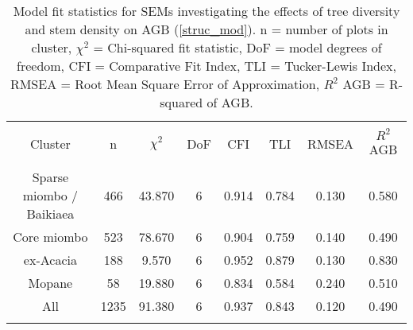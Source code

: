 
\begin{table}[!htbp] \centering 
  \caption{Model fit statistics for SEMs investigating the effects of tree diversity and stem density on AGB (\autoref{struc_mod}). n = number of plots in cluster, $\chi^{2}$ = Chi-squared fit statistic, DoF = model degrees of freedom, CFI = Comparative Fit Index, TLI = Tucker-Lewis Index, RMSEA = Root Mean Square Error of Approximation, $R^{2}$ AGB = R-squared of AGB.} 
  \label{struc_model_fit_clust_stats} 
\begin{tabular}{@{\extracolsep{0pt}} cccccccc} 
\\[-1.8ex]\hline 
\hline \\[-1.8ex] 
{Cluster} & {n} & {$\chi^{2}$} & {DoF} & {CFI} & {TLI} & {RMSEA} & {$R^{2}$ AGB} \\
\hline \\[-1.8ex] 
Sparse miombo / Baikiaea & 466 & 43.870 & 6 & 0.914 & 0.784 & 0.130 & 0.580 \\ 
Core miombo & 523 & 78.670 & 6 & 0.904 & 0.759 & 0.140 & 0.490 \\ 
ex-Acacia & 188 & 9.570 & 6 & 0.952 & 0.879 & 0.130 & 0.830 \\ 
Mopane & 58 & 19.880 & 6 & 0.834 & 0.584 & 0.240 & 0.510 \\ 
All & 1235 & 91.380 & 6 & 0.937 & 0.843 & 0.120 & 0.490 \\ 
\hline \\[-1.8ex] 
\end{tabular} 
\end{table} 
